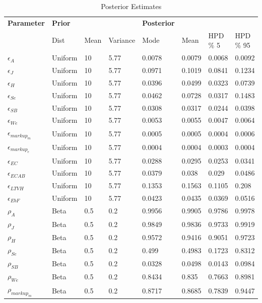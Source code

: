 \documentclass[12pt]{article}
\numberwithin{equation}{section}
\begin{document}
\begin{table}[H]
\caption{Posterior Estimates}
\label{post_dist}
\begin{tabular}{l||lll|llll}
\textbf{Parameter} & \textbf{Prior} & &  & \textbf{Posterior} &  &  &  \\
 & Dist & Mean & Variance & Mode & Mean & HPD \% 5 & HPD \% 95 \\
 \hline
 \hline
 $\epsilon_{A}$& Uniform & 10 & 5.77 & 0.0078 & 0.0079 & 0.0068 & 0.0092 \\
 $\epsilon_{J}$& Uniform & 10 & 5.77 & 0.0971 & 0.1019 & 0.0841 & 0.1234 \\
$\epsilon_{H}$ & Uniform & 10 & 5.77 & 0.0396 & 0.0499 & 0.0323 & 0.0739 \\
$\epsilon_{Se}$ & Uniform & 10 & 5.77 &0.0462 & 0.0728 & 0.0317 & 0.1483 \\
$\epsilon_{SB}$ & Uniform & 10 & 5.77 & 0.0308 & 0.0317 & 0.0244 & 0.0398 \\
$\epsilon_{We}$ & Uniform & 10 & 5.77 & 0.0053 & 0.0055 & 0.0047 & 0.0064 \\
$\epsilon_{markup_m}$ & Uniform & 10 & 5.77 & 0.0005 & 0.0005 & 0.0004 & 0.0006 \\
$\epsilon_{markup_e}$ & Uniform & 10 & 5.77 & 0.0004 & 0.0004 & 0.0003 & 0.0004 \\
$\epsilon_{EC}$ & Uniform & 10 & 5.77 & 0.0288 & 0.0295 & 0.0253 & 0.0341 \\
$\epsilon_{ECAB}$ & Uniform & 10 & 5.77 & 0.0379 & 0.038 & 0.029 & 0.0486 \\
$\epsilon_{LTVH}$ & Uniform & 10 & 5.77 &0.1353 & 0.1563 & 0.1105 & 0.208 \\
$\epsilon_{EbF}$ & Uniform & 10 & 5.77 & 0.0423 & 0.0435 & 0.0369 & 0.0516 \\
\hline
$\rho_{A}$ & Beta & 0.5 & 0.2 & 0.9956 & 0.9905 & 0.9786 & 0.9978 \\
 $\rho_{J}$ & Beta & 0.5 & 0.2 & 0.9849 & 0.9836 & 0.9733 & 0.9919 \\
$\rho_{H}$& Beta & 0.5 & 0.2 & 0.9572 & 0.9416 & 0.9051 & 0.9723 \\
$\rho_{Se}$ & Beta & 0.5 & 0.2 & 0.499 & 0.4983 & 0.1723 & 0.8312 \\
$\rho_{SB}$ & Beta & 0.5 & 0.2 &0.0328 & 0.0498 & 0.0143 & 0.0984 \\
$\rho_{We}$ & Beta & 0.5 & 0.2 &0.8434 & 0.835 & 0.7663 & 0.8981 \\
$\rho_{markup_m}$  & Beta & 0.5 & 0.2 & 0.8717 & 0.8685 & 0.7839 & 0.9447 \\

\end{tabular}
\end{table}
\end{document}
